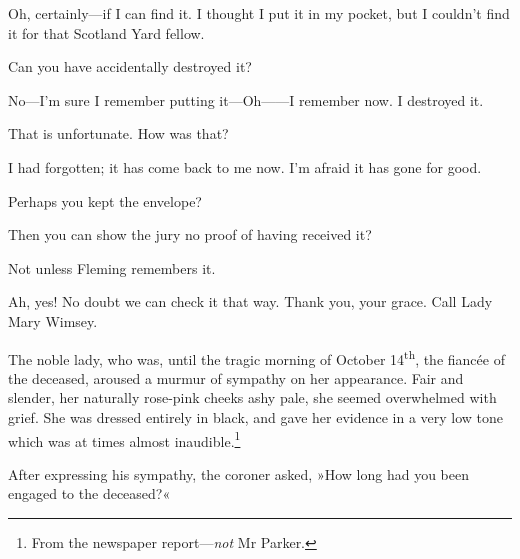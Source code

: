 \begin{dialogue}
 Oh, certainly\allowbreak---\allowbreak if I can find it. I thought I put it in my pocket, but I couldn't find it for that Scotland Yard fellow.

 Can you have accidentally destroyed it?

 No\allowbreak---\allowbreak I'm sure I remember putting it\allowbreak---\allowbreak Oh------I remember now. I destroyed it.

 That is unfortunate. How was that?

 I had forgotten; it has come back to me now. I'm afraid it has gone for good.

 Perhaps you kept the envelope?

 

 Then you can show the jury no proof of having received it?

 Not unless Fleming remembers it.

 Ah, yes! No doubt we can check it that way. Thank you, your grace. Call Lady Mary Wimsey.
\end{dialogue}

The noble lady, who was, until the tragic morning of October 14\textsuperscript{th}, the fiancée of the deceased, aroused a murmur of sympathy on her appearance. Fair and slender, her naturally rose-pink cheeks ashy pale, she seemed overwhelmed with grief. She was dressed entirely in black, and gave her evidence in a very low tone which was at times almost inaudible.\footnote{From the newspaper report—\textit{not} Mr Parker.}

After expressing his sympathy, the coroner asked, »How long had you been engaged to the deceased?«

